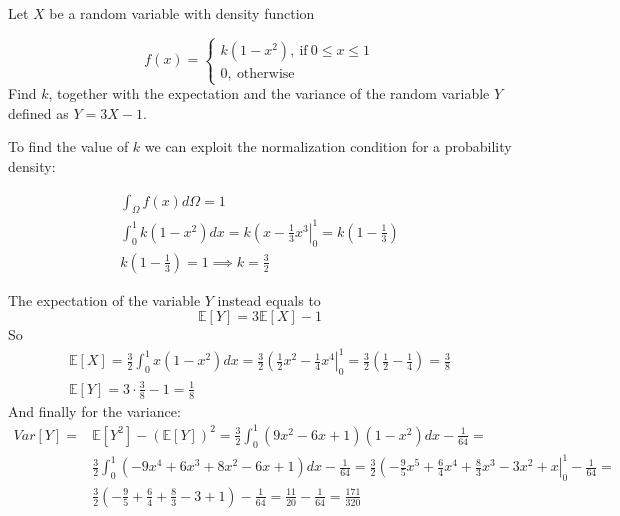 \begin{question}
Let $X$ be a random variable with density function

\begin{equation*}
f(x) = 
\begin{cases}
k(1 - x^2),~\textrm{if}~0 \leq x \leq 1\\
0,~\textrm{otherwise}		
\end{cases}
\end{equation*}
Find $k$, together with the expectation and the variance of the random variable $Y$ defined as $Y = 3X - 1$.
\end{question}

\cprotEnv\begin{solution}
\label{ex:variance}
To find the value of $k$ we can exploit the normalization condition for a probability density:

\begin{equation*}
\begin{gathered}
\int_\Omega f(x) d\Omega = 1\\
\int_{0}^{1}k(1-x^{2})dx = k\left(x-\frac{1}{3}x^{3}\right|_{0}^{1}= k\left(1-\frac{1}{3}\right) \\
k\left(1-\frac{1}{3}\right) = 1 \implies k = \frac{3}{2}
\end{gathered}
\end{equation*}

The expectation of the variable $Y$ instead equals to
\begin{equation*}
\mathbb{E}[Y] = 3\mathbb{E}[X] - 1
\end{equation*}	
So
\begin{equation*}
\begin{gathered}
\mathbb{E}[X] = \frac{3}{2}\int_{0}^{1}x(1-x^2)dx = \frac{3}{2}\left(\frac{1}{2}x^2-\frac{1}{4}x^{4}\right|_{0}^{1} = \frac{3}{2}\left(\frac{1}{2}-\frac{1}{4}\right) = \frac{3}{8} \\
\mathbb{E}[Y] = 3\cdot\frac{3}{8} - 1 = \frac{1}{8} 
\end{gathered}
\end{equation*}
And finally for the variance:
\begin{equation*}
\begin{aligned}
Var[Y] = & \mathbb{E}[Y^2] - (\mathbb{E}[Y])^2 = \frac{3}{2}\int_{0}^{1}(9x^2 - 6x + 1)(1-x^2)dx - \frac{1}{64} = \\  &\frac{3}{2}\int_{0}^{1}(- 9x^4 + 6x^3 + 8x^2 - 6x + 1)dx - \frac{1}{64} = 
\frac{3}{2}\left(- \frac{9}{5}x^5 + \frac{6}{4}x^4 + \frac{8}{3}x^3 - 3x^2 + x\right|_{0}^{1} - \frac{1}{64} = \\
& \frac{3}{2}\left(- \frac{9}{5} + \frac{6}{4} + \frac{8}{3} - 3 + 1\right) - \frac{1}{64} = \frac{11}{20} - \frac{1}{64} = \frac{171}{320}
\end{aligned}
\end{equation*}


\end{solution}
